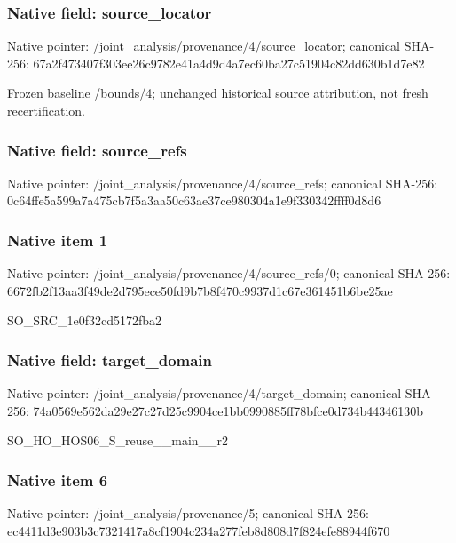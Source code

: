 \documentclass[10pt,a4paper]{article}
\begin{document}
\subsubsection{Native field: source\_\allowbreak{}locator}
Native pointer: /joint\_\allowbreak{}analysis/provenance/4/source\_\allowbreak{}locator; canonical SHA-256: 67a2f473407f303ee26c9782e41a4d9d4a7ec60ba27c51904c82dd630b1d7e82

\begingroup\raggedright\sloppy Frozen baseline /\allowbreak{}bounds/\allowbreak{}4;\allowbreak{} unchanged historical source attribution,\allowbreak{} not fresh recertification.\par\endgroup

\subsubsection{Native field: source\_\allowbreak{}refs}
Native pointer: /joint\_\allowbreak{}analysis/provenance/4/source\_\allowbreak{}refs; canonical SHA-256: 0c64ffe5a599a7a475cb7f5a3aa50c63ae37ce980304a1e9f330342ffff0d8d6

\subsubsection{Native item 1}
Native pointer: /joint\_\allowbreak{}analysis/provenance/4/source\_\allowbreak{}refs/0; canonical SHA-256: 6672fb2f13aa3f49de2d795ece50fd9b7b8f470c9937d1c67e361451b6be25ae

\begingroup\raggedright\sloppy SO\_\allowbreak{}SRC\_\allowbreak{}1e0f32cd5172fba2\par\endgroup

\subsubsection{Native field: target\_\allowbreak{}domain}
Native pointer: /joint\_\allowbreak{}analysis/provenance/4/target\_\allowbreak{}domain; canonical SHA-256: 74a0569e562da29e27c27d25c9904ce1bb0990885ff78bfce0d734b44346130b

\begingroup\raggedright\sloppy SO\_\allowbreak{}HO\_\allowbreak{}HOS06\_\allowbreak{}S\_\allowbreak{}reuse\_\allowbreak{}\_\allowbreak{}main\_\allowbreak{}\_\allowbreak{}r2\par\endgroup

\subsubsection{Native item 6}
Native pointer: /joint\_\allowbreak{}analysis/provenance/5; canonical SHA-256: ec4411d3e903b3c7321417a8cf1904c234a277feb8d808d7f824efe88944f670
\end{document}
